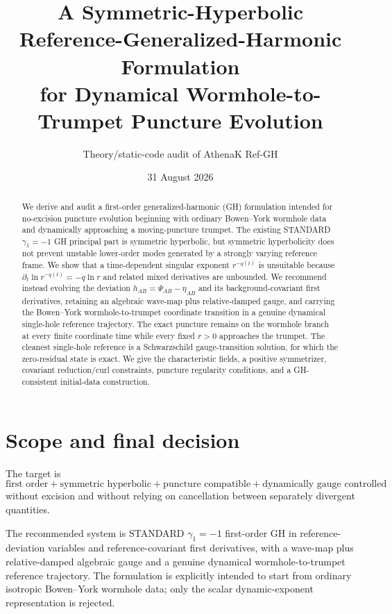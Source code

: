 \documentclass[11pt]{article}
\title{A Symmetric-Hyperbolic Reference-Generalized-Harmonic Formulation\\for Dynamical Wormhole-to-Trumpet Puncture Evolution}
\author{Theory/static-code audit of AthenaK Ref-GH}
\date{31 August 2026}
\begin{document}
\maketitle

\begin{abstract}
We derive and audit a first-order generalized-harmonic (GH) formulation intended for no-excision puncture evolution beginning with ordinary Bowen--York wormhole data and dynamically approaching a moving-puncture trumpet. The existing STANDARD $\gamma_1=-1$ GH principal part is symmetric hyperbolic, but symmetric hyperbolicity does not prevent unstable lower-order modes generated by a strongly varying reference frame. We show that a time-dependent singular exponent $r^{-q(t)}$ is unsuitable because $\partial_t\ln r^{-q(t)}=-\dot q\ln r$ and related mixed derivatives are unbounded. We recommend instead evolving the deviation $h_{AB}=\Psi_{AB}-\eta_{AB}$ and its background-covariant first derivatives, retaining an algebraic wave-map plus relative-damped gauge, and carrying the Bowen--York wormhole-to-trumpet coordinate transition in a genuine dynamical single-hole reference trajectory. The exact puncture remains on the wormhole branch at every finite coordinate time while every fixed $r>0$ approaches the trumpet. The cleanest single-hole reference is a Schwarzschild gauge-transition solution, for which the zero-residual state is exact. We give the characteristic fields, a positive symmetrizer, covariant reduction/curl constraints, puncture regularity conditions, and a GH-consistent initial-data construction.
\end{abstract}

\section{Scope and final decision}
The target is
\[
\boxed{\text{first order}+\text{symmetric hyperbolic}+\text{puncture compatible}+\text{dynamically gauge controlled}}
\]
without excision and without relying on cancellation between separately divergent quantities.

The recommended system is STANDARD $\gamma_1=-1$ first-order GH in reference-deviation variables and reference-covariant first derivatives, with a wave-map plus relative-damped algebraic gauge and a genuine dynamical wormhole-to-trumpet reference trajectory. The formulation is explicitly intended to start from ordinary isotropic Bowen--York wormhole data; only the scalar dynamic-exponent representation is rejected.
\end{document}
